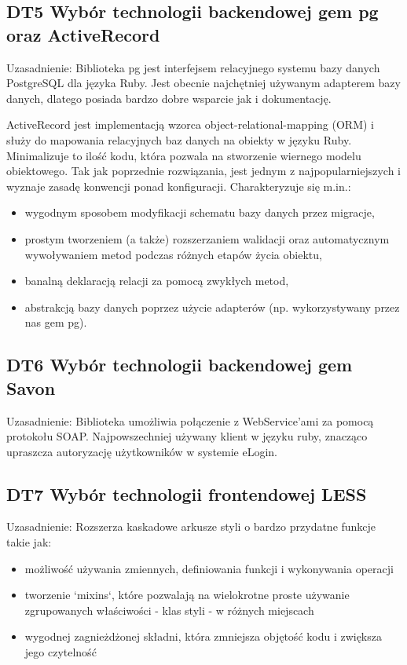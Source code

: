 \subsection{DT5 Wybór technologii backendowej gem pg oraz ActiveRecord}

Uzasadnienie: Biblioteka pg jest interfejsem relacyjnego systemu bazy danych PostgreSQL dla języka Ruby. Jest obecnie najchętniej używanym adapterem bazy danych, dlatego posiada bardzo dobre wsparcie jak i dokumentację.

ActiveRecord jest implementacją wzorca object-relational-mapping (ORM) i służy do mapowania relacyjnych baz danych na obiekty w języku Ruby. Minimalizuje to ilość kodu, która pozwala na stworzenie wiernego modelu obiektowego. Tak jak poprzednie rozwiązania, jest jednym z najpopularniejszych i wyznaje zasadę konwencji ponad konfiguracji. Charakteryzuje się m.in.:

\begin{itemize}
\item wygodnym sposobem modyfikacji schematu bazy danych przez migracje,
\item prostym tworzeniem (a także) rozszerzaniem walidacji oraz automatycznym wywoływaniem metod podczas różnych etapów życia obiektu,
\item banalną deklaracją relacji za pomocą zwykłych metod,
\item abstrakcją bazy danych poprzez użycie adapterów (np. wykorzystywany przez nas gem pg).
\end{itemize}

\subsection{DT6 Wybór technologii backendowej gem Savon}

Uzasadnienie: Biblioteka umożliwia połączenie z WebService’ami za pomocą protokołu SOAP. Najpowszechniej używany klient w języku ruby, znacząco upraszcza autoryzację użytkowników w systemie eLogin.

\subsection{DT7 Wybór technologii frontendowej LESS}

Uzasadnienie: Rozszerza kaskadowe arkusze styli o bardzo przydatne funkcje takie jak: 

\begin{itemize}
\item możliwość używania zmiennych, definiowania funkcji i wykonywania operacji
\item tworzenie `mixins`, które pozwalają na wielokrotne proste używanie zgrupowanych właściwości - klas styli - w różnych miejscach
\item wygodnej zagnieżdżonej składni, która zmniejsza objętość kodu i zwiększa jego czytelność
\end{itemize}	

